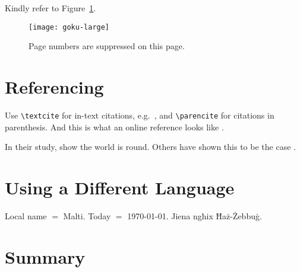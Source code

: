 Kindly refer to Figure~\ref{fig:largegoku}. 

\blindtext

\begin{figure}[!ht]
	\centering
	\texttt{[image: goku-large]}
	\caption[Short Random Caption]{Page numbers are suppressed on this page.}
	\label{fig:largegoku}
\end{figure}

\blindtext
\FloatBarrier %

\section{Referencing}

Use \texttt{\textbackslash textcite} for in-text citations, e.g.\ \textcite{Einstein1905}, and \texttt{\textbackslash parencite} for citations in parenthesis. And this is what an online reference looks like \parencite{WinNT}.

In their study, \textcite{Einstein1905} show the world is round. Others have shown this to be the case \parencite{Arrighi2003, Ebejer2016}.

\section{Using a Different Language}

\begin{otherlanguage}{maltese}
Local name $=$ Malti. Today $=$ \today. Jiena ngħix Ħaż-Żebbuġ.
\end{otherlanguage}

\section{Summary}

\blindtext